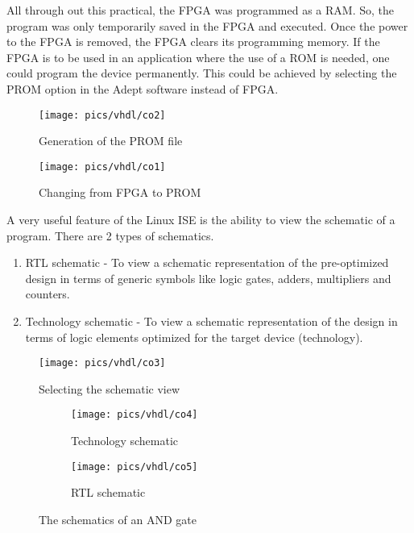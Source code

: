 All through out this practical, the FPGA was programmed as a RAM. So, the program was only temporarily saved in the FPGA and executed. Once the power to the FPGA is removed, the FPGA clears its programming memory. If the FPGA is to be used in an application where the use of a ROM is needed, one could program the device permanently. This could be achieved by selecting the PROM option in the Adept software instead of FPGA. 

\begin{figure}[h!]
	\centering
	\texttt{[image: pics/vhdl/co2]}
	\caption{Generation of the PROM file}
	\label{fig:co2}
\end{figure}

\begin{figure}[h!]
	\centering
	\texttt{[image: pics/vhdl/co1]}
	\caption{Changing from FPGA to PROM}
	\label{fig:co1}
\end{figure}

\noindent
A very useful feature of the Linux ISE is the ability to view the schematic of a program. There are 2 types of schematics.
\begin{enumerate}
	\item RTL schematic - To view a schematic representation of the pre-optimized design in terms of generic symbols like logic gates, adders, multipliers and counters.
	\item Technology schematic - To view a schematic representation of the design in terms of logic elements optimized for the target device (technology).
\end{enumerate}

\begin{figure}[h!]
	\centering
	\texttt{[image: pics/vhdl/co3]}
	\caption{Selecting the schematic view}
	\label{fig:co1}
\end{figure}

\begin{figure}[!h]
	\centering
	\begin{subfigure}{.5\textwidth}
		\centering
		\texttt{[image: pics/vhdl/co4]}
		\caption{ Technology schematic }
		\label{fig:co4}
	\end{subfigure}%
	\begin{subfigure}{.5\textwidth}
		\centering
		\texttt{[image: pics/vhdl/co5]}
		\caption{RTL schematic}
		\label{fig:co5}
	\end{subfigure}
	\caption{The schematics of an AND gate}
	\label{fig:cor}
\end{figure}

